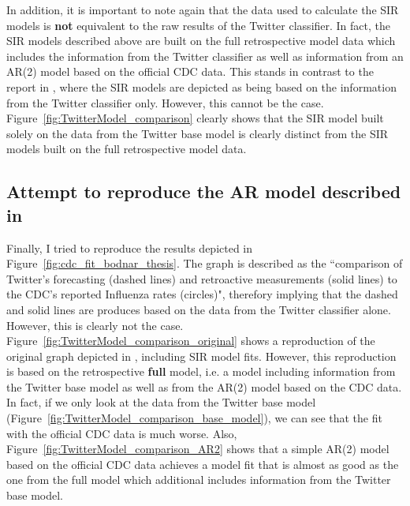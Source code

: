 \documentclass[11pt, a4paper,twoside]{report}\usepackage[]{graphicx}\usepackage[]{color}
\begin{document}
In addition, it is important to note again that the data used to calculate the SIR models is \textbf{not} equivalent to the raw results of the Twitter classifier. In fact, the SIR models described above are built on the full retrospective model data which includes the information from the Twitter classifier as well as information from an AR(2) model based on the official CDC data. This stands in contrast to the report in \citep{bodnar_data_2015}, where the SIR models are depicted as being based on the information from the Twitter classifier only. However, this cannot be the case. Figure~\ref{fig:TwitterModel_comparison} clearly shows that the SIR model built solely on the data from the Twitter base model is clearly distinct from the SIR models built on the full retrospective model data.  

\subsection{Attempt to reproduce the AR model described in \citep{bodnar_data_2015}}
Finally, I tried to reproduce the results depicted in Figure~\ref{fig:cdc_fit_bodnar_thesis}. The graph is described as the ``comparison of Twitter's forecasting (dashed lines) and retroactive measurements (solid lines) to the CDC's reported Influenza rates (circles)", therefory implying that the dashed and solid lines are produces based on the data from the Twitter classifier alone. However, this is clearly not the case. Figure~\ref{fig:TwitterModel_comparison_original} shows a reproduction of the original graph depicted in \citep{bodnar_data_2015}, including SIR model fits. However, this reproduction is based on the retrospective \textbf{full} model, i.e. a model including information from the Twitter base model as well as from the AR(2) model based on the CDC data. In fact, if we only look at the data from the Twitter base model (Figure~\ref{fig:TwitterModel_comparison_base_model}), we can see that the fit with the official CDC data is much worse. Also, Figure~\ref{fig:TwitterModel_comparison_AR2} shows that a simple AR(2) model based on the official CDC data achieves a model fit that is almost as good as the one from the full model which additional includes information from the Twitter base model.
\end{document}
